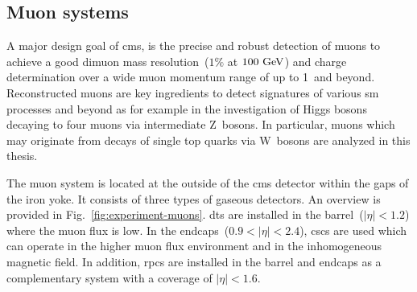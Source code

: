

\subsection{Muon systems}
\label{sec:experiment-muon-systems}

A major design goal of \gls{cms}, is the precise and robust detection of muons to achieve a good dimuon mass resolution~($1\%$ at $100~\mathrm{GeV}$) and charge determination over a wide muon momentum range of up to 1~\TeV and beyond. Reconstructed muons are key ingredients to detect signatures of various \gls{sm} processes and beyond as for example in the investigation of Higgs bosons decaying to four muons via intermediate Z~bosons. In particular, muons which may originate from decays of single top quarks via W~bosons are analyzed in this thesis.

The muon system is located at the outside of the \gls{cms} detector within the gaps of the iron yoke. It consists of three types of gaseous detectors. An overview is provided in Fig.~\ref{fig:experiment-muons}. \glspl{dt} are installed in the barrel~($|\eta|<1.2$) where the muon flux is low. In the endcaps~($0.9<|\eta|<2.4$), \glspl{csc} are used which can operate in the higher muon flux environment and in the inhomogeneous magnetic field. In addition, \glspl{rpc} are installed in the barrel and endcaps as a complementary system with a coverage of $|\eta|<1.6$.


